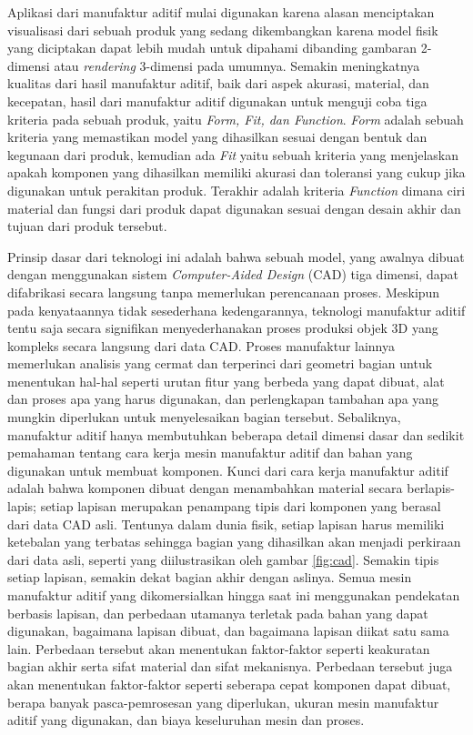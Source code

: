 Aplikasi dari manufaktur aditif mulai digunakan karena alasan menciptakan visualisasi dari sebuah produk yang sedang dikembangkan karena model fisik yang diciptakan dapat lebih mudah untuk dipahami dibanding gambaran 2-dimensi atau \textit{rendering} 3-dimensi pada umumnya. Semakin meningkatnya kualitas dari hasil manufaktur aditif, baik dari aspek akurasi, material, dan kecepatan, hasil dari manufaktur aditif digunakan untuk menguji coba tiga kriteria pada sebuah produk, yaitu \textit{Form, Fit, dan Function}. \textit{Form} adalah sebuah kriteria yang memastikan model yang dihasilkan sesuai dengan bentuk dan kegunaan dari produk, kemudian ada \textit{Fit} yaitu sebuah kriteria yang menjelaskan apakah komponen yang dihasilkan memiliki akurasi dan toleransi yang cukup jika digunakan untuk perakitan produk. Terakhir adalah kriteria \textit{Function} dimana ciri material dan fungsi dari produk dapat digunakan sesuai dengan desain akhir dan tujuan dari produk tersebut.

Prinsip dasar dari teknologi ini adalah bahwa sebuah model, yang awalnya dibuat dengan menggunakan sistem \textit{Computer-Aided Design} (CAD) tiga dimensi, dapat difabrikasi secara langsung tanpa memerlukan perencanaan proses. Meskipun pada kenyataannya tidak sesederhana kedengarannya, teknologi manufaktur aditif tentu saja secara signifikan menyederhanakan proses produksi objek 3D yang kompleks secara langsung dari data CAD. Proses manufaktur lainnya memerlukan analisis yang cermat dan terperinci dari geometri bagian untuk menentukan hal-hal seperti urutan fitur yang berbeda yang dapat dibuat, alat dan proses apa yang harus digunakan, dan perlengkapan tambahan apa yang mungkin diperlukan untuk menyelesaikan bagian tersebut. Sebaliknya, manufaktur aditif hanya membutuhkan beberapa detail dimensi dasar dan sedikit pemahaman tentang cara kerja mesin manufaktur aditif dan bahan yang digunakan untuk membuat komponen. Kunci dari cara kerja manufaktur aditif adalah bahwa komponen dibuat dengan menambahkan material secara berlapis-lapis; setiap lapisan merupakan penampang tipis dari komponen yang berasal dari data CAD asli. Tentunya dalam dunia fisik, setiap lapisan harus memiliki ketebalan yang terbatas sehingga bagian yang dihasilkan akan menjadi perkiraan dari data asli, seperti yang diilustrasikan oleh gambar \ref{fig:cad}. Semakin tipis setiap lapisan, semakin dekat bagian akhir dengan aslinya. Semua mesin manufaktur aditif yang dikomersialkan hingga saat ini menggunakan pendekatan berbasis lapisan, dan perbedaan utamanya terletak pada bahan yang dapat digunakan, bagaimana lapisan dibuat, dan bagaimana lapisan diikat satu sama lain. Perbedaan tersebut akan menentukan faktor-faktor seperti keakuratan bagian akhir serta sifat material dan sifat mekanisnya. Perbedaan tersebut juga akan menentukan faktor-faktor seperti seberapa cepat komponen dapat dibuat, berapa banyak pasca-pemrosesan yang diperlukan, ukuran mesin manufaktur aditif yang digunakan, dan biaya keseluruhan mesin dan proses.

